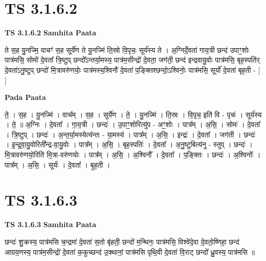 \documentclass[17pt]{extarticle}
\begin{document}
\section*{ TS 3.1.6.2 }

\textbf{TS 3.1.6.2 } \newline
\textbf{Samhita Paata} \newline

ते स॒ह यु॒नज्मि॒ वाचꣳ॑ स॒ह सूर्ये॑ण ते यु॒नज्मि॑ ति॒स्रो वि॒पृचः॒ सूर्य॑स्य ते । अ॒ग्निर्दे॒वता॑ गाय॒त्री छन्द॑ उपाꣳ॒॒शोः पात्र॑मसि॒ सोमो॑ दे॒वता᳚ त्रि॒ष्टुप् छन्दो᳚ऽन्तर्या॒मस्य॒ पात्र॑म॒सीन्द्रो॑ दे॒वता॒ जग॑ती॒ छन्द॑ इन्द्रवायु॒वोः पात्र॑मसि॒ बृह॒स्पति॑र् दे॒वता॑ऽनु॒ष्टुप् छन्दो॑ मि॒त्रावरु॑णयोः॒ पात्र॑मस्य॒श्विनौ॑ दे॒वता॑ प॒ङ्क्तिश्छन्दो॒ऽश्विनोः॒ पात्र॑मसि॒ सूर्यो॑ दे॒वता॑ बृह॒ती - [  ] \newline

\textbf{Pada Paata} \newline

ते॒ । स॒ह । यु॒नज्मि॑ । वाच᳚म् । स॒ह । सूर्ये॑ण । ते॒ । यु॒नज्मि॑ । ति॒स्रः । वि॒पृच॒ इति॑ वि - पृचः॑ । सूर्य॑स्य । ते॒ ॥ अ॒ग्निः । दे॒वता᳚ । गा॒य॒त्री । छन्दः॑ । उ॒पाꣳ॒॒शोरित्यु॑प - अꣳ॒॒शोः । पात्र᳚म् । अ॒सि॒ । सोमः॑ । दे॒वता᳚ । त्रि॒ष्टुप् । छन्दः॑ । अ॒न्त॒र्या॒मस्येत्य॑न्तः - या॒मस्य॑ । पात्र᳚म् । अ॒सि॒ । इन्द्रः॑ । दे॒वता᳚ । जग॑ती । छन्दः॑ । इ॒न्द्र॒वा॒यु॒वोरिती᳚न्द्र-वा॒यु॒वोः । पात्र᳚म् । अ॒सि॒ । बृह॒स्पतिः॑ । दे॒वता᳚ । अ॒नु॒ष्टुबित्य॑नु - स्तुप् । छन्दः॑ । मि॒त्रावरु॑णयो॒रिति॑ मि॒त्रा-वरु॑णयोः । पात्र᳚म् । अ॒सि॒ । अ॒श्विनौ᳚ । दे॒वता᳚ । प॒ङ्क्तिः । छन्दः॑ । अ॒श्विनोः᳚ । पात्र᳚म् । अ॒सि॒ । सूर्यः॑ । दे॒वता᳚ । बृ॒ह॒ती ।  \newline




\section*{ TS 3.1.6.3 }

\textbf{TS 3.1.6.3 } \newline
\textbf{Samhita Paata} \newline

छन्दः॑ शु॒क्रस्य॒ पात्र॑मसि च॒न्द्रमा॑ दे॒वता॑ स॒तो बृ॑हती॒ छन्दो॑ म॒न्थिनः॒ पात्र॑मसि॒ विश्वे॑दे॒वा दे॒वतो॒ष्णिहा॒ छन्द॑ आग्रय॒णस्य॒ पात्र॑म॒सीन्द्रो॑ दे॒वता॑ क॒कुच्छन्द॑ उ॒क्थानां॒ पात्र॑मसि पृथि॒वी दे॒वता॑ वि॒राट् छन्दो᳚ ध्रु॒वस्य॒ पात्र॑मसि ॥ \newline
\end{document}
